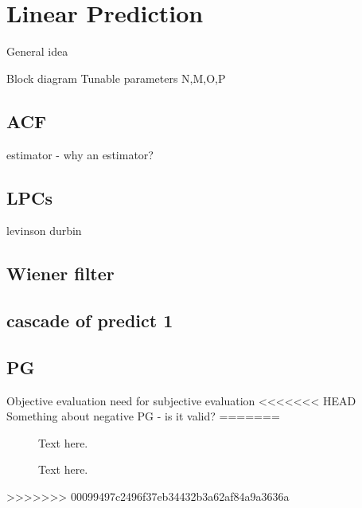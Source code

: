 \section{Linear Prediction}
General idea

Block diagram
Tunable parameters N,M,O,P


\subsection{ACF}
estimator - why an estimator?

\subsection{LPCs}
levinson durbin

\subsection{Wiener filter}

\subsection{cascade of predict 1}

\subsection{PG}
Objective evaluation
need for subjective evaluation
<<<<<<< HEAD
Something about negative PG - is it valid? 
=======


\begin{figure}[H]
	
	\label{Fig:BasisCompare}
	\caption{Text here.}
\end{figure}

\begin{figure}[H]
	
	\label{Fig:LPCompare}
	\caption{Text here.}
\end{figure}


>>>>>>> 00099497c2496f37eb34432b3a62af84a9a3636a
